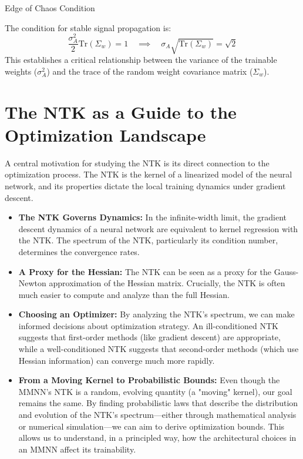 \documentclass[12pt]{article}
\begin{document}
{Edge of Chaos Condition}

The condition for stable signal propagation is:
\begin{equation}
    \frac{\sigma_A^2}{2} \text{Tr}(\Sigma_w) = 1 \quad \implies \quad \sigma_A \sqrt{\text{Tr}(\Sigma_w)} = \sqrt{2}
\end{equation}
This establishes a critical relationship between the variance of the trainable weights ($\sigma_A^2$) and the trace of the random weight covariance matrix ($\Sigma_w$).

\section{The NTK as a Guide to the Optimization Landscape}
A central motivation for studying the NTK is its direct connection to the optimization process. The NTK is the kernel of a linearized model of the neural network, and its properties dictate the local training dynamics under gradient descent.

\begin{itemize}
    \item \textbf{The NTK Governs Dynamics:} In the infinite-width limit, the gradient descent dynamics of a neural network are equivalent to kernel regression with the NTK. The spectrum of the NTK, particularly its condition number, determines the convergence rates.
    \item \textbf{A Proxy for the Hessian:} The NTK can be seen as a proxy for the Gauss-Newton approximation of the Hessian matrix. Crucially, the NTK is often much easier to compute and analyze than the full Hessian.
    \item \textbf{Choosing an Optimizer:} By analyzing the NTK's spectrum, we can make informed decisions about optimization strategy. An ill-conditioned NTK suggests that first-order methods (like gradient descent) are appropriate, while a well-conditioned NTK suggests that second-order methods (which use Hessian information) can converge much more rapidly.
    \item \textbf{From a Moving Kernel to Probabilistic Bounds:} Even though the MMNN's NTK is a random, evolving quantity (a "moving" kernel), our goal remains the same. By finding probabilistic laws that describe the distribution and evolution of the NTK's spectrum—either through mathematical analysis or numerical simulation—we can aim to derive optimization bounds. This allows us to understand, in a principled way, how the architectural choices in an MMNN affect its trainability.
\end{itemize}
\end{document}
